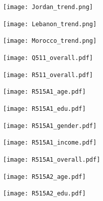 \documentclass{article}
\begin{document}
\begin{figure}[H]
\centering
\caption{}
\texttt{[image: Jordan\_trend.png]}
\label{fig:my_label}
\end{figure}

\begin{figure}[H]
\centering
\caption{}
\texttt{[image: Lebanon\_trend.png]}
\label{fig:my_label}
\end{figure}

\begin{figure}[H]
\centering
\caption{}
\texttt{[image: Morocco\_trend.png]}
\label{fig:my_label}
\end{figure}

\begin{figure}[H]
\centering
\caption{}
\texttt{[image: Q511\_overall.pdf]}
\label{fig:my_label}
\end{figure}

\begin{figure}[H]
\centering
\caption{}
\texttt{[image: R511\_overall.pdf]}
\label{fig:my_label}
\end{figure}

\begin{figure}[H]
\centering
\caption{}
\texttt{[image: R515A1\_age.pdf]}
\label{fig:my_label}
\end{figure}

\begin{figure}[H]
\centering
\caption{}
\texttt{[image: R515A1\_edu.pdf]}
\label{fig:my_label}
\end{figure}

\begin{figure}[H]
\centering
\caption{}
\texttt{[image: R515A1\_gender.pdf]}
\label{fig:my_label}
\end{figure}

\begin{figure}[H]
\centering
\caption{}
\texttt{[image: R515A1\_income.pdf]}
\label{fig:my_label}
\end{figure}

\begin{figure}[H]
\centering
\caption{}
\texttt{[image: R515A1\_overall.pdf]}
\label{fig:my_label}
\end{figure}

\begin{figure}[H]
\centering
\caption{}
\texttt{[image: R515A2\_age.pdf]}
\label{fig:my_label}
\end{figure}

\begin{figure}[H]
\centering
\caption{}
\texttt{[image: R515A2\_edu.pdf]}
\label{fig:my_label}
\end{figure}
\end{document}
